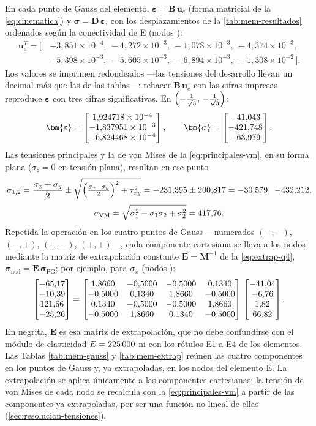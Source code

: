 En cada punto de Gauss del elemento, $\bm{\varepsilon}=\bm{B}\,\bm{u}_e$ (forma matricial de la \autoref{eq:cinematica}) y $\bm{\sigma}=\bm{D}\,\bm{\varepsilon}$, con los desplazamientos de la \autoref{tab:mem-resultados} ordenados según la conectividad de E\showId{} (nodos \showNodes):
\[
\begin{aligned}
\bm{u}_e^{T}=\bigl[\,&{-}3{,}851\times10^{-4},\ -4{,}272\times10^{-3},\ -1{,}078\times10^{-3},\ -4{,}374\times10^{-3},\\
&{-}5{,}398\times10^{-3},\ -5{,}605\times10^{-3},\ -6{,}894\times10^{-3},\ -1{,}308\times10^{-2}\,\bigr].
\end{aligned}
\]
Los valores se imprimen redondeados ---las tensiones del desarrollo llevan un decimal más que las de las tablas---: rehacer $\bm{B}\,\bm{u}_e$ con las cifras impresas reproduce $\bm{\varepsilon}$ con tres cifras significativas. En $\left(-\tfrac{1}{\sqrt{3}},\,-\tfrac{1}{\sqrt{3}}\right)$:
\[
\bm{\varepsilon}=\epsA,
\qquad
\bm{\sigma}=\sigA .
\]
Las tensiones principales y la de von Mises de la \autoref{eq:principales-vm}, en su forma plana ($\sigma_z = 0$ en tensión plana), resultan en ese punto
\[
\sigma_{1,2}=\frac{\sigma_x+\sigma_y}{2}\pm\sqrt{\Bigl(\tfrac{\sigma_x-\sigma_y}{2}\Bigr)^{2}+\tau_{xy}^{2}}=\savgA\pm\radiusA=\sigOneA,\ \sigTwoA ,
\]
\[
\sigma_{\mathrm{VM}}=\sqrt{\sigma_1^{2}-\sigma_1\sigma_2+\sigma_2^{2}}=417{,}76 .
\]
Repetida la operación en los cuatro puntos de Gauss —numerados $(-,-)$, $(-,+)$, $(+,-)$, $(+,+)$—, cada componente cartesiana se lleva a los nodos mediante la matriz de extrapolación constante $\bm{E}=\bm{M}^{-1}$ de la \autoref{eq:extrap-q4}, $\bm{\sigma}_{\mathrm{nod}}=\bm{E}\,\bm{\sigma}_{\mathrm{PG}}$; por ejemplo, para $\sigma_x$ (nodos \showNodes):
{\footnotesize\setlength{\arraycolsep}{4pt}
\[
\begin{bmatrix} -65{,}17 \\ -10{,}39 \\ 121{,}66 \\ -25{,}26 \end{bmatrix}=\begin{bmatrix} 1{,}8660 & -0{,}5000 & -0{,}5000 & 0{,}1340 \\ -0{,}5000 & 0{,}1340 & 1{,}8660 & -0{,}5000 \\ 0{,}1340 & -0{,}5000 & -0{,}5000 & 1{,}8660 \\ -0{,}5000 & 1{,}8660 & 0{,}1340 & -0{,}5000 \end{bmatrix}\,\begin{bmatrix} -41{,}04 \\ -6{,}76 \\ 1{,}82 \\ 66{,}82 \end{bmatrix} .
\]
}%
En negrita, $\bm{E}$ es esa matriz de extrapolación, que no debe confundirse con el módulo de elasticidad $E=225\,000$ ni con los rótulos E1 a E4 de los elementos.
Las Tablas \ref{tab:mem-gauss} y \ref{tab:mem-extrap} reúnen las cuatro componentes en los puntos de Gauss y, ya extrapoladas, en los nodos del elemento E\showId{}. La extrapolación se aplica únicamente a las componentes cartesianas: la tensión de von Mises de cada nodo se recalcula con la \autoref{eq:principales-vm} a partir de las componentes ya extrapoladas, por ser una función no lineal de ellas (\autoref{sec:resolucion-tensiones}).

